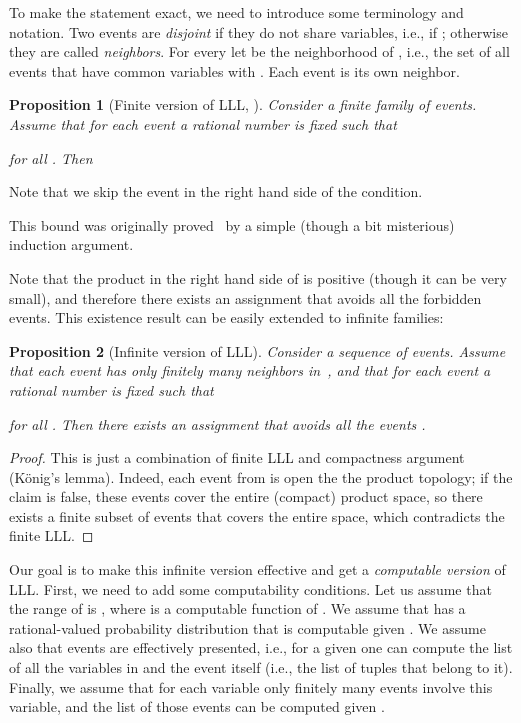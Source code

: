 \documentclass[12pt]{article}
\newtheorem{proposition}{Proposition}
\begin{document}
To make the statement exact, we need to introduce some terminology and notation. Two events  are \emph{disjoint} if they do not share variables, i.e., if ; otherwise they are called \emph{neighbors}. For every  let  be the neighborhood of , i.e., the set of all events  that have common variables with . Each event is its own neighbor.

\begin{proposition}[Finite version of LLL, \cite{original-lovasz}]
     \label{finite}
Consider a finite family  of events. Assume that for each event  a rational number  is fixed such that
    
for all . Then

\end{proposition}

Note that we skip the event  in the right hand side of the condition.

This bound was originally proved~\cite{original-lovasz} by a simple (though a bit misterious) induction argument.

Note that the product in the right hand side of  is positive (though it can be very small), and therefore there exists an assignment that avoids all the forbidden events. This existence result can be easily extended to infinite families:

\begin{proposition}[Infinite version of LLL]
     \label{infinite}
Consider a sequence  of events. Assume that each event  has only finitely many neighbors in~, and that for each event  a rational number  is fixed such that
    
for all . Then there exists an assignment that avoids all the events .
\end{proposition}

\begin{proof}
This is just a combination of finite LLL and compactness argument (K\"onig's lemma). Indeed, each event from  is open the the product topology; if the claim
is false, these events cover the entire (compact) product space, so there exists
a finite subset of events that covers the entire space, which contradicts the
finite LLL.
\end{proof}

Our goal is to make this infinite version effective and get a \emph{computable version} of LLL.  First, we need to add some computability conditions. Let us assume that the range of  is , where  is a computable function of . We assume that  has a rational-valued probability distribution that is computable given . We assume also that events   are effectively presented, i.e., for a given  one can compute the list of all the variables in  and the event itself (i.e., the list of tuples that belong to it).  Finally, we assume that for each variable  only finitely many events involve this variable, and the list of those events can be computed given .
\end{document}
